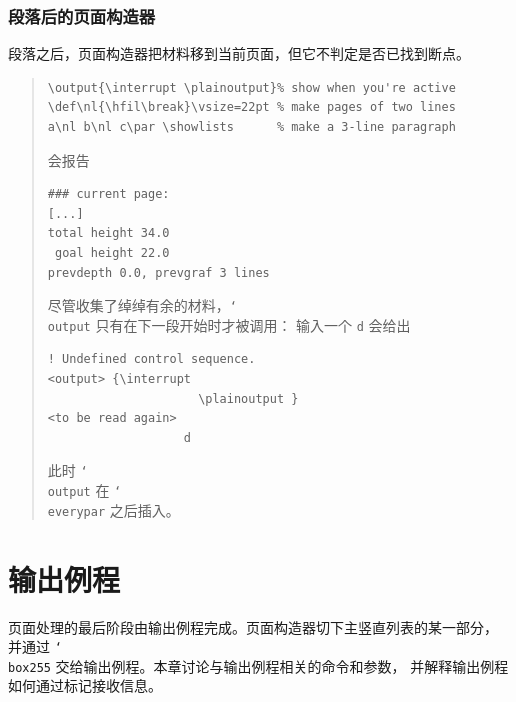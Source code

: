 \documentclass[a4paper]{rapport3}
\def\nl{\protect\\}\def\n#1{{\tt #1}}\def\cs#1{{\tt\char`\\#1}}\let\csc\cs
\newenvironment{example}{\begin{quotation}}{\end{quotation}}
\begin{document}
\subsection{段落后的页面构造器}
\label{par:page:build}

段落之后，页面构造器把材料移到当前页面，但它不判定是否已找到断点。

\begin{example}\begin{verbatim}
\output{\interrupt \plainoutput}% show when you're active
\def\nl{\hfil\break}\vsize=22pt % make pages of two lines
a\nl b\nl c\par \showlists      % make a 3-line paragraph
\end{verbatim}
会报告
\begin{verbatim}
### current page:
[...]
total height 34.0
 goal height 22.0
prevdepth 0.0, prevgraf 3 lines
\end{verbatim}
尽管收集了绰绰有余的材料，\cs{output} 只有在下一段开始时才被调用：
输入一个 \n d 会给出
\begin{verbatim}
! Undefined control sequence.
<output> {\interrupt 
                     \plainoutput }
<to be read again> 
                   d
\end{verbatim}
此时 \cs{output} 在 \cs{everypar} 之后插入。
\end{example}

\endofchapter
\chapter{输出例程}\label{output}

页面处理的最后阶段由输出例程完成。页面构造器切下主竖直列表的某一部分，
并通过 \cs{box255} 交给输出例程。本章讨论与输出例程相关的命令和参数，
并解释输出例程如何通过标记接收信息。
\end{document}
